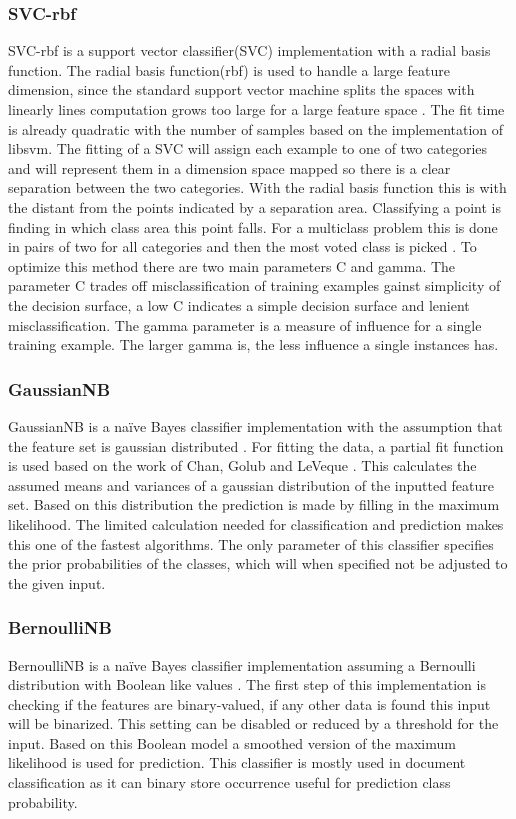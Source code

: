 \documentclass[a4paper,10pt]{article}
\begin{document}
\subsubsection{SVC-rbf}
SVC-rbf is a support vector classifier(SVC) implementation with a radial basis function. The radial basis function(rbf) is used to handle a large feature dimension, since the standard support vector machine splits the spaces with linearly lines computation grows too large for a large feature space \cite{SVN}. The fit time is already quadratic with the number of samples based on the implementation of libsvm\cite{SVM}. The fitting of a SVC will assign each example to one of two categories and will represent them in a dimension space mapped so there is a clear separation between the two categories. With the radial basis function this is with the distant from the points indicated by a separation area. Classifying a point is finding in which class area this point falls. For a multiclass problem this is done in pairs of two for all categories and then the most voted class is picked \cite{Multi-pair-coup}. To optimize this method there are two main parameters C and gamma. The parameter C trades off misclassification of training examples gainst simplicity of the decision surface, a low C indicates a simple decision surface and lenient misclassification. The gamma parameter is a measure of influence for a single training example. The larger gamma is, the less influence a single instances has.

\subsubsection{GaussianNB}
GaussianNB is a naïve Bayes classifier implementation with the  assumption that the feature set is gaussian distributed \cite{Bayes}. For fitting the data, a partial fit function is used based on the work of Chan, Golub and LeVeque \cite{Sam-var}. This calculates the assumed means and variances of a gaussian distribution of the inputted feature set. Based on this distribution the prediction is made by filling in the maximum likelihood. The limited calculation needed for classification and prediction makes this one of the fastest algorithms. The only parameter of this classifier specifies the prior probabilities of the classes, which will when specified not be adjusted to the given input. 

\subsubsection{BernoulliNB}
BernoulliNB is a naïve Bayes classifier implementation assuming a Bernoulli distribution with Boolean like values \cite{NB-text}. The first step of this implementation is checking if the features are binary-valued, if any other data is found this input will be binarized. This setting can be disabled or reduced by a threshold for the input. Based on this Boolean model a smoothed version of the maximum likelihood is used for prediction. This classifier is mostly used in document classification as it can binary store occurrence useful for prediction class probability.
\end{document}
